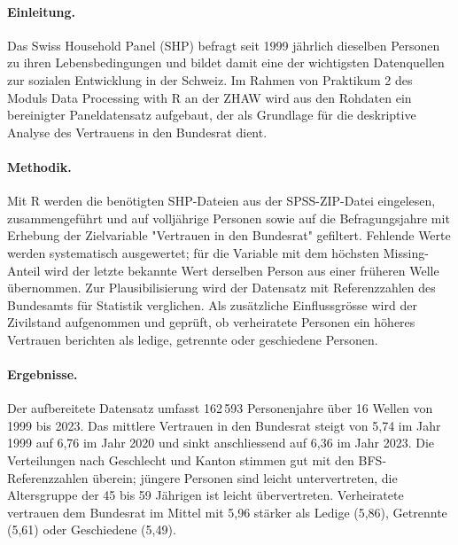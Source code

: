 

\begin{extraAbstract}
\addchaptertocentry{\extraabstractname}

\paragraph{Einleitung.}
Das Swiss Household Panel (SHP) befragt seit 1999 jährlich dieselben Personen zu ihren
Lebensbedingungen und bildet damit eine der wichtigsten Datenquellen zur sozialen
Entwicklung in der Schweiz. Im Rahmen von Praktikum 2 des Moduls Data Processing with R
an der ZHAW wird aus den Rohdaten ein bereinigter Paneldatensatz aufgebaut, der als
Grundlage für die deskriptive Analyse des Vertrauens in den Bundesrat dient.

\paragraph{Methodik.}
Mit R werden die benötigten SHP-Dateien aus der SPSS-ZIP-Datei eingelesen,
zusammengeführt und auf volljährige Personen sowie auf die Befragungsjahre mit
Erhebung der Zielvariable "Vertrauen in den Bundesrat" gefiltert. Fehlende Werte
werden systematisch ausgewertet; für die Variable mit dem höchsten Missing-Anteil wird
der letzte bekannte Wert derselben Person aus einer früheren Welle übernommen. Zur
Plausibilisierung wird der Datensatz mit Referenzzahlen des Bundesamts für Statistik 
verglichen. Als zusätzliche Einflussgrösse wird der Zivilstand
aufgenommen und geprüft, ob verheiratete Personen ein höheres Vertrauen
berichten als ledige, getrennte oder geschiedene Personen.

\paragraph{Ergebnisse.}
Der aufbereitete Datensatz umfasst 162\,593 Personenjahre über 16 Wellen von 1999 bis
2023. Das mittlere Vertrauen in den Bundesrat steigt von 5{,}74 im Jahr 1999 auf 6{,}76
im Jahr 2020 und sinkt anschliessend auf 6{,}36 im Jahr 2023. Die Verteilungen nach
Geschlecht und Kanton stimmen gut mit den BFS-Referenzzahlen überein; jüngere Personen
sind leicht untervertreten, die Altersgruppe der 45 bis 59 Jährigen ist leicht
übervertreten. Verheiratete vertrauen dem Bundesrat im Mittel mit 5{,}96 stärker als
Ledige (5{,}86), Getrennte (5{,}61) oder Geschiedene (5{,}49).


\end{extraAbstract}
